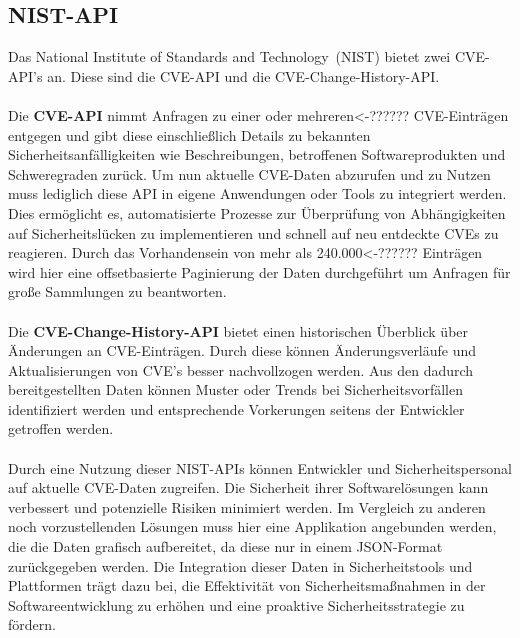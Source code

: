 \subsection{NIST-API} \label{sec:NIST-API}
Das \glqq National Institute of Standards and Technology\grqq~(NIST) bietet zwei CVE-API's an.
Diese sind die CVE-API und die CVE-Change-History-API.
\\ \\
Die \textbf{CVE-API} nimmt Anfragen zu einer oder mehreren<-?????? CVE-Einträgen entgegen und gibt diese einschließlich Details zu bekannten Sicherheitsanfälligkeiten wie Beschreibungen, betroffenen Softwareprodukten und Schweregraden zurück.
Um nun aktuelle CVE-Daten abzurufen und zu Nutzen muss lediglich diese API in eigene Anwendungen oder Tools zu integriert werden.
Dies ermöglicht es, automatisierte Prozesse zur Überprüfung von Abhängigkeiten auf Sicherheitslücken zu implementieren und schnell auf neu entdeckte CVEs zu reagieren.
Durch das Vorhandensein von mehr als 240.000<-?????? Einträgen wird hier eine offsetbasierte Paginierung der Daten durchgeführt um Anfragen für große Sammlungen zu beantworten.
\\ \\
Die \textbf{CVE-Change-History-API} bietet einen historischen Überblick über Änderungen an CVE-Einträgen.
Durch diese können Änderungsverläufe und Aktualisierungen von CVE's besser nachvollzogen werden.
Aus den dadurch bereitgestellten Daten können Muster oder Trends bei Sicherheitsvorfällen identifiziert werden und entsprechende Vorkerungen seitens der Entwickler getroffen werden.
\\ \\
Durch eine Nutzung dieser NIST-APIs können Entwickler und Sicherheitspersonal auf aktuelle CVE-Daten zugreifen.
Die Sicherheit ihrer Softwarelösungen kann verbessert und potenzielle Risiken minimiert werden.
Im Vergleich zu anderen noch vorzustellenden Lösungen muss hier eine Applikation angebunden werden, die die Daten grafisch aufbereitet, da diese nur in einem JSON-Format zurückgegeben werden. 
Die Integration dieser Daten in Sicherheitstools und Plattformen trägt dazu bei, die Effektivität von Sicherheitsmaßnahmen in der Softwareentwicklung zu erhöhen und eine proaktive Sicherheitsstrategie zu fördern.



